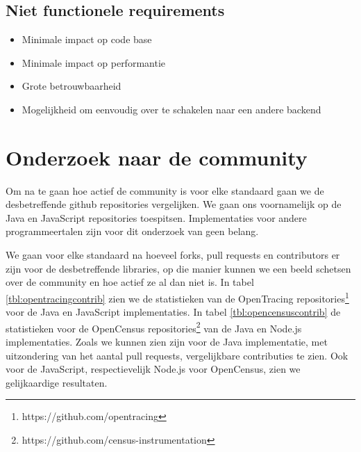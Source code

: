 \subsection{Niet functionele requirements}
\begin{itemize}
	\item Minimale impact op code base
	\item Minimale impact op performantie
	\item Grote betrouwbaarheid
	\item Mogelijkheid om eenvoudig over te schakelen naar een andere backend
\end{itemize}

\section{Onderzoek naar de community}
Om na te gaan hoe actief de community is voor elke standaard gaan we de desbetreffende github repositories vergelijken. We gaan ons voornamelijk op de Java en JavaScript repositories toespitsen. Implementaties voor andere programmeertalen zijn voor dit onderzoek van geen belang.

We gaan voor elke standaard na hoeveel forks, pull requests en contributors er zijn voor de desbetreffende libraries, op die manier kunnen we een beeld schetsen over de community en hoe actief ze al dan niet is. In tabel \ref{tbl:opentracingcontrib} zien we de statistieken van de OpenTracing repositories\footnote{https://github.com/opentracing} voor de Java en JavaScript implementaties. In tabel \ref{tbl:opencensuscontrib} de statistieken voor de OpenCensus repositories\footnote{https://github.com/census-instrumentation} van de Java en Node.js implementaties. Zoals we kunnen zien zijn voor de Java implementatie, met uitzondering van het aantal pull requests, vergelijkbare contributies te zien. Ook voor de JavaScript, respectievelijk Node.js voor OpenCensus, zien we gelijkaardige resultaten.

